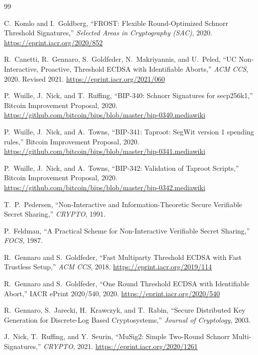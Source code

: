 
\begin{thebibliography}{99}

C.~Komlo and I.~Goldberg,
``FROST: Flexible Round-Optimized Schnorr Threshold Signatures,''
\textit{Selected Areas in Cryptography (SAC)}, 2020.
\url{https://eprint.iacr.org/2020/852}

R.~Canetti, R.~Gennaro, S.~Goldfeder, N.~Makriyannis, and U.~Peled,
``UC Non-Interactive, Proactive, Threshold ECDSA with Identifiable Aborts,''
\textit{ACM CCS}, 2020. Revised 2021.
\url{https://eprint.iacr.org/2021/060}

P.~Wuille, J.~Nick, and T.~Ruffing,
``BIP-340: Schnorr Signatures for secp256k1,''
Bitcoin Improvement Proposal, 2020.
\url{https://github.com/bitcoin/bips/blob/master/bip-0340.mediawiki}

P.~Wuille, J.~Nick, and A.~Towns,
``BIP-341: Taproot: SegWit version 1 spending rules,''
Bitcoin Improvement Proposal, 2020.
\url{https://github.com/bitcoin/bips/blob/master/bip-0341.mediawiki}

P.~Wuille, J.~Nick, and A.~Towns,
``BIP-342: Validation of Taproot Scripts,''
Bitcoin Improvement Proposal, 2020.
\url{https://github.com/bitcoin/bips/blob/master/bip-0342.mediawiki}

T.~P.~Pedersen,
``Non-Interactive and Information-Theoretic Secure Verifiable Secret Sharing,''
\textit{CRYPTO}, 1991.

P.~Feldman,
``A Practical Scheme for Non-Interactive Verifiable Secret Sharing,''
\textit{FOCS}, 1987.

R.~Gennaro and S.~Goldfeder,
``Fast Multiparty Threshold ECDSA with Fast Trustless Setup,''
\textit{ACM CCS}, 2018.
\url{https://eprint.iacr.org/2019/114}

R.~Gennaro and S.~Goldfeder,
``One Round Threshold ECDSA with Identifiable Abort,''
IACR ePrint 2020/540, 2020.
\url{https://eprint.iacr.org/2020/540}

R.~Gennaro, S.~Jarecki, H.~Krawczyk, and T.~Rabin,
``Secure Distributed Key Generation for Discrete-Log Based Cryptosystems,''
\textit{Journal of Cryptology}, 2003.

J.~Nick, T.~Ruffing, and Y.~Seurin,
``MuSig2: Simple Two-Round Schnorr Multi-Signatures,''
\textit{CRYPTO}, 2021.
\url{https://eprint.iacr.org/2020/1261}


\end{thebibliography}
